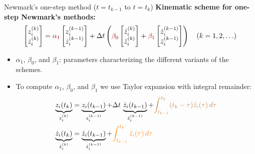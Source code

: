 \documentclass[aspectratio=169]{beamer}
\begin{document}
\begin{frame}{Newmark's one-step method ($t=t_{k-1}$ to $t=t_{k}$)}
  \textbf{Kinematic scheme for one-step Newmark's methods:}
  \[
    \begin{bmatrix}
      z_i^{(k)} \\
      \dot{z}_i^{(k)}
    \end{bmatrix}
    =
    \textcolor{darkred}{\alpha_1}
    \begin{bmatrix}
      z_i^{(k-1)} \\
      \dot{z}_i^{(k-1)}
    \end{bmatrix}
    +
    \Delta t \left(
    \textcolor{darkred}{\beta_0}
    \begin{bmatrix}
      \dot{z}_i^{(k)} \\
      \ddot{z}_i^{(k)}
    \end{bmatrix}
    +
    \textcolor{darkred}{\beta_1}
    \begin{bmatrix}
      \dot{z}_i^{(k-1)} \\
      \ddot{z}_i^{(k-1)}
    \end{bmatrix}
    \right)
    \quad (k = 1, 2, \ldots)
  \]
  \begin{itemize}
    \item \(\alpha_1\), \(\beta_0\), and \(\beta_1\): parameters characterizing the different variants of the schemes.
    \item To compute \(\alpha_1\), \(\beta_0\), and \(\beta_1\) we use Taylor expansion with integral remainder:
          \begin{align*}
            \underbrace{z_i(t_k)}_\text{$z_i^{(k)}$}            & = \underbrace{z_i(t_{k-1})}_\text{$z_i^{(k-1)}$} + \Delta t \, \underbrace{\dot{z}_i(t_{k-1})}_\text{$\dot z_i^{(k-1)}$} +{\color{brown} \int_{t_{k-1}}^{t_k} (t_k - \tau) \ddot{z}_i(\tau) \, d\tau }
            \\
            \underbrace{\dot{z}_i(t_k)}_\text{$\dot z_i^{(k)}$} & = \underbrace{\dot{z}_i(t_{k-1})}_\text{$\dot z_i^{(k-1)}$}+{\color{orange} \int_{t_{k-1}}^{t_k} \ddot{z}_i(\tau) \, d\tau}
          \end{align*}
  \end{itemize}
\end{frame}
\end{document}
